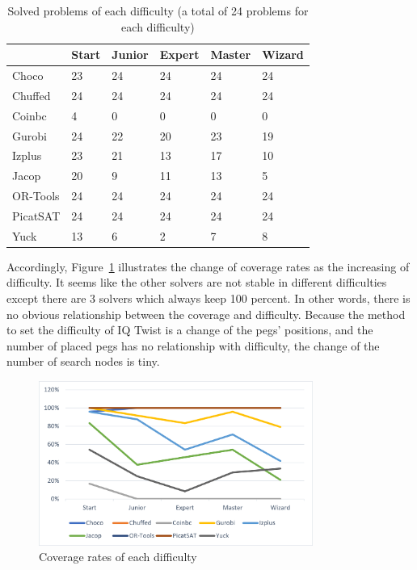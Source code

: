 \begin{table}[htbp]
\centering
\caption{Solved problems of each difficulty (a total of 24 problems for each difficulty)}
\label{tab:solvedproblemforeach difficulty}
\begin{tabular}{|l|l|l|l|l|l|}
\hline
	    &Start&	Junior&	Expert&	Master&	Wizard\\
\hline
Choco   &23   &24 &24 &24 &24\\
\hline
Chuffed	&24   &24 &24 &24 &24\\
\hline
Coinbc	&4    &0  &0  &	0 &0\\
\hline
Gurobi	&24   &22 &20 &	23&19\\
\hline
Izplus	&23   &21 &13 &	17&10\\
\hline
Jacop	&20   &9  &11 &13 &5\\
\hline
OR-Tools	&24   &24 &24 &	24&24\\
\hline
PicatSAT&24   &24 &24 &24 &24\\
\hline
Yuck    &13	  &6  &2  &7  &8\\
\hline
\end{tabular}
\end{table}
Accordingly, Figure~\ref{fig:comparisonIQtwist} illustrates the change of coverage rates as the increasing of difficulty. It seems like the other solvers are not stable in different difficulties except there are 3 solvers which always keep 100 percent. In other words, there is no obvious relationship between the coverage and difficulty. Because the method to set the difficulty of IQ Twist is a change of the pegs' positions, and the number of placed pegs has no relationship with difficulty, the change of the number of search nodes is tiny. 
\begin{figure}[H]
    \centering
    \includegraphics[width=0.8\textwidth]{figs/separated coverage.png}
    \caption{Coverage rates of each difficulty}
    \label{fig:comparisonIQtwist}
\end{figure}
